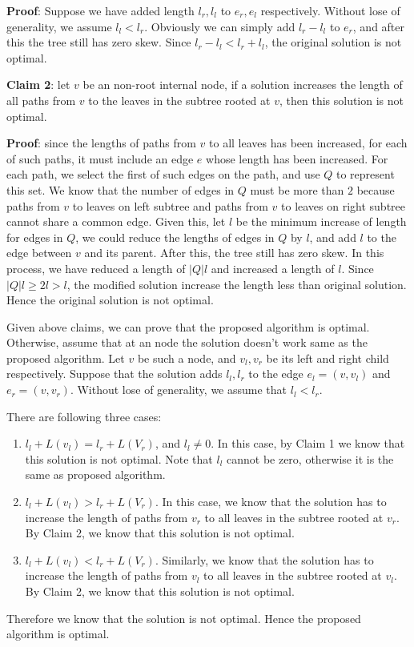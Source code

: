 \documentclass{article}
\begin{document}
\textbf{Proof}: Suppose we have added length $l_r, l_l$ to $e_r, e_l$ respectively. Without lose of
generality, we assume $l_l < l_r$. Obviously we can simply add $l_r - l_l$ to $e_r$, and after this
the tree still has zero skew. Since $l_r - l_l < l_r + l_l$, the original solution is not optimal.

\textbf{Claim 2}: let $v$ be an non-root internal node, if a solution increases the length of all paths from
$v$ to the leaves in the subtree rooted at $v$, then this solution is not optimal.

\textbf{Proof}: since the lengths of paths from $v$ to all leaves has been increased, for each
of such paths, it must include an edge $e$ whose length has been increased. For each path, we select
the first of such edges on the path, and use $Q$ to represent this set. We know that the number of edges
in $Q$ must be more than $2$ because paths from $v$ to leaves on left subtree and paths from $v$ 
to leaves on right subtree cannot share a common edge. Given this, let $l$ be the minimum increase
of length for edges in $Q$, we could reduce the  lengths of edges in $Q$ by $l$, and add $l$ to the
edge between $v$ and its parent. After this, the tree still has zero skew. In this process, we have
reduced a length of $|Q|l$ and increased a length of $l$. Since $|Q|l \geq 2l > l$, the modified solution increase
the length less than original solution. Hence the original solution is not optimal.

Given above claims, we can prove that the proposed algorithm is optimal. Otherwise, assume that
at an node the solution doesn't work same as the proposed algorithm. Let $v$ be such a node, and
$v_l, v_r$ be its left and right child respectively. Suppose that the solution adds $l_l, l_r$ to 
the edge $e_l = (v, v_l)$ and $e_r = (v, v_r)$. Without lose of generality, we assume that $l_l <
l_r$. 

There are following three cases:
\begin{enumerate}
  \item $l_l  + L(v_l) = l_r + L(V_r)$, and $l_l \neq 0$. In this case, by Claim 1 we know that this
    solution is not optimal. Note that $l_l$ cannot be zero, otherwise it is the same as proposed
    algorithm.

  \item $l_l  + L(v_l) > l_r + L(V_r)$. In this case, we know that the solution has to increase the
    length of paths from $v_r$ to all leaves in the subtree rooted at $v_r$. By Claim 2, we know
    that this solution is not optimal.

  \item $l_l  + L(v_l) < l_r + L(V_r)$. Similarly, we know that the solution has to increase the
    length of paths from $v_l$ to all leaves in the subtree rooted at $v_l$. By Claim 2, we know
    that this solution is not optimal.
\end{enumerate}
Therefore we know that the solution is not optimal. Hence the proposed algorithm is optimal.
\end{document}
